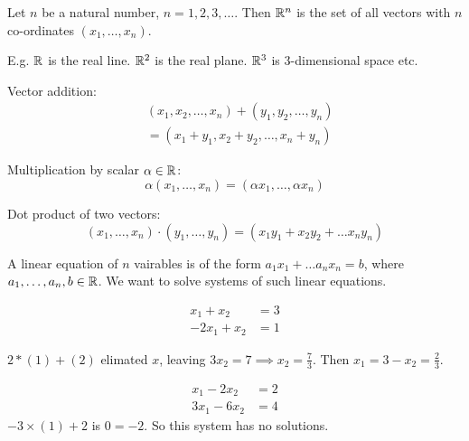 \documentclass[10pt]{scrartcl}
\begin{document}
\vsp

\begin{definition}Let $n$ be a natural number, $n = 1,2,3,\dots$. Then $\mathbb{R}^n$ is the set of all vectors with $n$ co-ordinates $(x_1,\dots,x_n)$. \end{definition}
E.g. $\mathbb{R}$ is the real line. $\mathbb{R}^2$ is the real plane. $\mathbb{R}^3$ is 3-dimensional space etc.\\	


\begin{definition}

Vector addition:\[
\begin{aligned}
 &(x_1,x_2,\dots,x_n) + (y_1,y_2,\dots,y_n)\\
  &= (x_1 + y_1,x_2 + y_2,\dots,x_n+y_n)
\end{aligned}
\]

Multiplication by scalar $\alpha\in\mathbb{R}$: \[\alpha(x_1,\dots,x_n) = (\alpha x_1,\dots,\alpha x_n)\]

Dot product of two vectors: \[(x_1,\dots,x_n)\cdot(y_1,\dots,y_n) = (x_1y_1 + x_2y_2 + \dots x_ny_n)\]
\end{definition}


A linear equation of $n$ vairables is of the form $a_1x_1 + \dots a_nx_n = b$, where $a_1,\dots,a_n,b\in\mathbb{R}$. We want to solve systems of such linear equations.\\

\begin{example}
\begin{align*}
x_1 + x_2 &= 3 \tag{1}\\
-2x_1 + x_2 &= 1\tag{2}	
\end{align*}

$2 * (1) + (2)$ elimated $x$, leaving $3x_2 = 7 \implies x_2 = \frac{7}{3}$. Then $x_1 = 3-x_2 = \frac{2}{3}$. 
	
\end{example}\vspace*{5pt}

\begin{example}
\begin{align*}
  x_1 - 2x_2 &= 2 \tag{1}\\
  3x_1 - 6x_2 &= 4\tag{2}
\end{align*}
$-3\times (1) + 2$ is $0= -2$. So this system has no solutions. 
\end{example}\vspace*{5pt}
\end{document}
